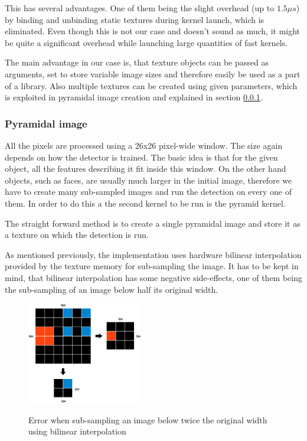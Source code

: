 This has several advantages. One of them being the slight overhead (up to $1.5 \mu s$) by binding and unbinding static textures during kernel launch, which is eliminated. Even though this is not our case and doesn't sound as much, it might be quite a significant overhead while launching large quantities of fast kernels.

The main advantage in our case is, that texture objects can be passed as arguments, set to store variable image sizes and therefore easily be used as a part of a library. Also multiple textures can be created using given parameters, which is exploited in pyramidal image creation and explained in section \ref{subsubsec:pyramidal}.

\subsubsection{Pyramidal image}\label{subsubsec:pyramidal}

All the pixels are processed using a 26x26 pixel-wide window. The size again depends on how the detector is trained. The basic idea is that for the given object, all the features describing it fit inside this window. On the other hand objects, such as faces, are usually much larger in the initial image, therefore we have to create many sub-sampled images and run the detection on every one of them. In order to do this a the second kernel to be run is the pyramid kernel.

The straight forward method is to create a single pyramidal image and store it as a texture on which the detection is run.

As mentioned previously, the implementation uses hardware bilinear interpolation provided by the texture memory for sub-sampling the image. It has to be kept in mind, that bilinear interpolation has some negative side-effects, one of them being the sub-sampling of an image below half its original width.

\begin{center}
\begin{figure}[ht]
	\centering\includegraphics[width=0.45\textwidth]{fig/bilinear_error.eps}\label{fig:bilinear-error}
	\caption{Error when sub-sampling an image below twice the original width using bilinear interpolation}
\end{figure}
\end{center}

